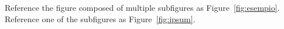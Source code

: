 \begin{comment}

[nico-iv-pillku]
"antenas que fabricamos localmente."

"El firmware que instalamos: AlterMesh, permite la auto-configuración de los equipos de manera que al arrancar el nodo ya “sabe” como participar de la mesh. "

"todo el pueblo funcione como una gran red local, lo que facilita la implementación de servicios y compartir contenidos."

"Los riesgos de sufrir ataques informáticos en una red libre no difieren particularmente de los riesgos que afrontan otros tipos de redes"
"El hecho de que la red permita con más facilidad a las personas ofrecer servicios y compartir contenidos, genera también una conciencia diferente sobre el uso de la red y de sus dispositivos. Creemos que esta toma de conciencia es positiva también en relación a la seguridad."

[FiTre2015]
autonomous local networks + uplink to the internet (which is a potential bottleneck)
gibts in Altermundis redes local services? (vgl nicos iv)
ja --> "Contamos con un portal del pueblo donde todos pueden publicar información e inclusive clasificados. También tenemos un servicio interno de chat, independiente de redes externas, que al igual que el servicio de llamadas de Voz sobre IP (en experimentación) nos permite conectarnos entre vecinos de manera fluída. La Radio FM del pueblo aprovecha la red para hacer transmisión en vivo de su programación, tanto a la red local como a Internet."


[Latour2010]
"the technology.. /digital technology .. makes networks material and explicit" (infrastruktur ist präsent und sichtbar im öffentlichen Raum) --> wem gehört die Infrastruktur? wer kontrolliert die? Wer hat (physischen) Zugang dazu?
  geografía: terreno difícil; quien controla la infraestructura?

"subversion it introduces in the notion of distance (the adjectives “close” and “far” are
made dependant on the presence of conduits, bridges, and hubs)," <-- physical network
\end{comment}

Reference the figure composed of multiple subfigures as Figure~\vref{fig:esempio}. Reference one of the subfigures as Figure~\vref{fig:ipsum}. %

